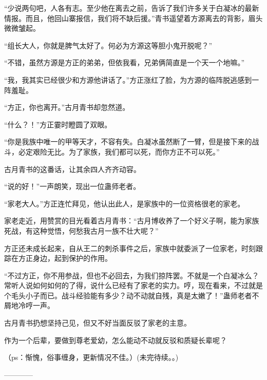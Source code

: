 \begin{this_body}
“少说两句吧，人各有志。至少他在离去之前，告诉了我们许多关于白凝冰的最新情报。而且，他回山寨报信，我们将不缺后援。”青书遥望着方源离去的背影，眉头微微皱起。

“组长大人，你就是脾气太好了。何必为方源这等胆小鬼开脱呢？”

“不错，虽然方源是方正的弟弟，但依我看，兄弟俩简直是一个天一个地嘛。”

“我，我其实已经很少和方源他讲话了。”方正涨红了脸，为方源的临阵脱逃感到一阵羞耻。

“方正，你也离开。”古月青书却忽然道。

“什么？！”方正霎时瞪圆了双眼。

“你是我族中唯一的甲等天才，不容有失。白凝冰虽然断了一臂，但是接下来的战斗，必定艰险无比。为了家族，我们都可以死，而你方正不可以死。”

古月青书的这番话，让其余四人齐齐动容。

“说的好！”一声朗笑，现出一位蛊师老者。

“家老大人。”方正连忙拜见，他认出此人，是家族中的一位资格很老的家老。

家老走近，用赞赏的目光看着古月青书：“古月博收养了一个好义子啊，能为家族死战，有这种觉悟，何愁我古月一族不壮大呢？”

方正还未成长起来，自从王二的刺杀事件之后，家族中就委派了一位家老，时刻跟踪在方正身边，起到保护的作用。

“不过方正，你不用参战，但也不必回去，为我们掠阵罢。不就是一个白凝冰么？常听人说如何如何的了得，说什么已经有了家老的实力。哼，现在看来，不过就是个毛头小子而已。战斗经验能有多少？动不动就自残，真是太嫩了！”蛊师老者不屑地冷哼一声。

古月青书扔想坚持己见，但又不好当面反驳了家老的主意。

作为一个后辈，要做到尊老爱幼，怎么能动不动就反驳和质疑长辈呢？

（ps：惭愧，俗事缠身，更新情况不佳。）(未完待续。。)

------------

\end{this_body}

